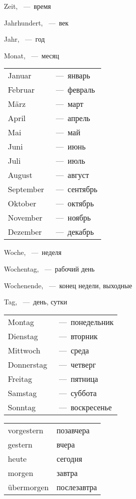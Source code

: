 
 Zeit, ~---~время

 Jahrhundert, ~---~век

 Jahr, ~---~год

 Monat, ~---~месяц

\begin{tabular}{ll}
Januar & ~---~январь \\
Februar & ~---~февраль \\
M\" arz & ~---~март \\
April & ~---~апрель \\
Mai & ~---~май \\
Juni & ~---~июнь \\
Juli & ~---~июль \\
August & ~---~август \\
September & ~---~сентябрь \\
Oktober & ~---~октябрь \\
November & ~---~ноябрь \\
Dezember & ~---~декабрь
\end{tabular}

 Woche, ~---~неделя

 Wochentag, ~---~рабочий день

 Wochenende, ~---~конец недели, выходные

 Tag, ~---~день, сутки
 
\begin{tabular}{ll}
Montag & ~---~понедельник \\
Dienstag & ~---~вторник \\
Mittwoch & ~---~среда \\
Donnerstag & ~---~четверг \\
Freitag & ~---~пятница \\
Samstag & ~---~суббота \\
Sonntag & ~---~воскресенье
\end{tabular}

\begin{tabular}{ll}
vorgestern & позавчера \\
gestern & вчера \\
heute & сегодня \\
morgen & завтра \\
\"ubermorgen & послезавтра \\
\end{tabular}

